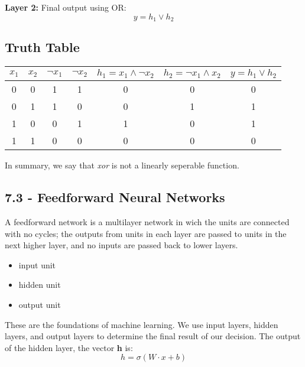 \documentclass{article}
\begin{document}
\textbf{Layer 2:} Final output using OR:
\[
    y = h_1 \lor h_2
\]

\subsection*{Truth Table}

\begin{center}
    \renewcommand{\arraystretch}{1.2}
    \begin{tabular}{|c|c|c|c|c|c|c|}
        \hline
        $x_1$ & $x_2$ & $\neg x_1$ & $\neg x_2$ & $h_1 = x_1 \land \neg x_2$ & $h_2 = \neg x_1 \land x_2$ & $y = h_1 \lor h_2$ \\
        \hline
        0     & 0     & 1          & 1          & 0                          & 0                          & 0                  \\
        0     & 1     & 1          & 0          & 0                          & 1                          & 1                  \\
        1     & 0     & 0          & 1          & 1                          & 0                          & 1                  \\
        1     & 1     & 0          & 0          & 0                          & 0                          & 0                  \\
        \hline
    \end{tabular}
\end{center}

In summary, we say that \textit{xor} is not a linearly seperable function.

\subsection{7.3 - Feedforward Neural Networks}

A feedforward network is a multilayer network in wich the units are connected with no cycles; the outputs from units in each layer are passed to units in the next higher layer,
and no inputs are passed back to lower layers.
\begin{itemize}
    \item input unit
    \item hidden unit
    \item output unit
\end{itemize}

These are the foundations of machine learning. We use input layers, hidden layers, and output layers to determine the final result of our decision.
\newline
The output of the hidden layer, the vector \textbf{h} is:
\[
    h = \sigma (W\cdot x + b)
\]
\end{document}

